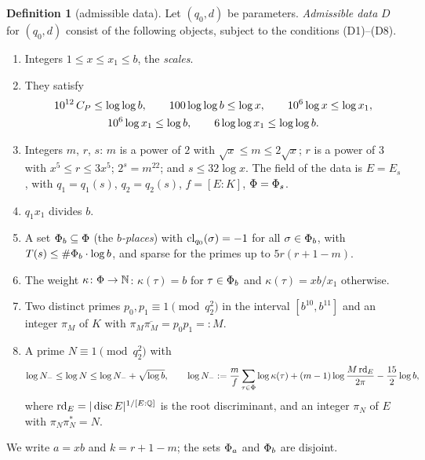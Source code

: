 \documentclass[10pt]{amsart}
\theoremstyle{definition}
\newtheorem{definition}[theorem]{Definition}
\theoremstyle{remark}
\begin{document}
\begin{definition}[admissible data]\label{an:def-data}\label{an:data}
Let $(q_0,d)$ be parameters. \emph{Admissible data} $D$ for $(q_0,d)$ consist
of the following objects, subject to the conditions \textup{(D1)--(D8)}.
\begin{enumerate}
\item[(D1)] Integers $1\le x\le x_1\le b$, the \emph{scales}.
\item[(D2)] They satisfy
\begin{gather*}
 10^{12}\,C_P\le\log\log b,\qquad 100\log\log b\le\log x,\qquad 10^{6}\log x\le\log x_1,\\
 10^{6}\log x_1\le\log b,\qquad 6\log\log x_1\le\log\log b .
\end{gather*}
\item[(D3)] Integers $m$, $r$, $s$: $m$ is a power of $2$ with
$\sqrt x\le m\le2\sqrt x$; $r$ is a power of $3$ with $x^{5}\le r\le3x^{5}$;
$2^{s}=m^{22}$; and $s\le32\log x$. The field of the data is $E=E_s$, with
$q_1=q_1(s)$, $q_2=q_2(s)$, $f=[E:K]$, $\Phi=\Phi_s$.
\item[(D4)] $q_1x_1$ divides $b$.
\item[(D5)] A set $\Phi_b\subseteq\Phi$ (the \emph{$b$-places}) with
$\mathrm{cl}_{q_0}(\sigma)=-1$ for all $\sigma\in\Phi_b$, with
$T(s)\le\#\Phi_b\cdot\log b$, and sparse for the primes up to $5r(r+1-m)$.
\item[(D6)] The weight $\kappa\colon\Phi\to\mathbb N$: $\kappa(\tau)=b$ for
$\tau\in\Phi_b$ and $\kappa(\tau)=xb/x_1$ otherwise.
\item[(D7)] Two distinct primes $p_0,p_1\equiv1\pmod{q_2^{2}}$ in the interval
$[b^{10},b^{11}]$ and an integer $\pi_M$ of $K$ with
$\pi_M\overline{\pi_M}=p_0p_1=:M$.
\item[(D8)] A prime $N\equiv1\pmod{q_2^{2}}$ with
\[
 \log N_-\le\log N\le\log N_-+\sqrt{\log b},\qquad
 \log N_-:=\frac mf\sum_{\tau\in\Phi}\log\kappa(\tau)+(m-1)\log\frac{M\,\mathrm{rd}_E}{2\pi}-\frac{15}2\log b ,
\]
where $\mathrm{rd}_E=|\operatorname{disc}E|^{1/[E:\mathbb Q]}$ is the root
discriminant, and an integer $\pi_N$ of $E$ with $\pi_N\pi_N^{*}=N$.
\end{enumerate}
We write $a=xb$ and $k=r+1-m$; the sets $\Phi_a$ and $\Phi_b$ are disjoint.
\end{definition}
\end{document}
